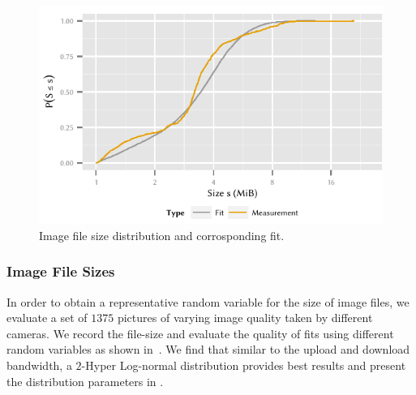\begin{figure}
  \includegraphics{application/cloud_file_synchronization/application_measurements/figures/image_size}
  \caption{Image file size distribution \imageFileSize and corrosponding fit.}
  \label{fig:application:cloud_file_synchronisation:application_measurements:bandwidth_preparation_times:measurement_setup:image_size}
\end{figure}

\subsubsection*{Image File Sizes}\label{sec:application:cloud_file_synchronisation:application_measurements:image_file_sizes}
In order to obtain a representative random variable for the size of image files, we evaluate a set of \({1375}\) pictures of varying image quality taken by different cameras.
We record the file-size and evaluate the quality of fits using different random variables as shown in~.
We find that similar to the upload and download bandwidth, a \(2\)-Hyper Log-normal distribution provides best results and present the distribution parameters in .

